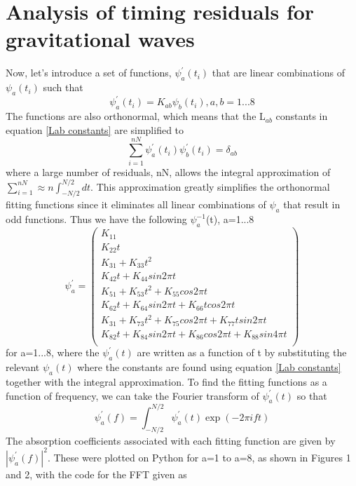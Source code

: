 \documentclass[12pt]{article}
\begin{document}
	\section{Analysis of timing residuals for gravitational waves}
	
	
	Now, let's introduce a set of functions, $\psi_{a}^{'}(t_i)$ that are linear combinations of $\psi_a(t_i)$ such that
	\begin{equation}\label{psi'}
	\psi_{a}^{'}(t_i)=K_{ab}\psi_{b}(t_i), a,b=1...8
	\end{equation}
	The functions are also orthonormal, which means that the L$_{ab}$ constants in equation \ref{Lab constants} are simplified to
	\begin{equation}\label{psi'orthonormal}
	\sum_{i=1}^{nN}\psi_{a}^{'}(t_i)\psi_{b}^{'}(t_i)=\delta_{ab}
	\end{equation}
	where a large number of residuals, nN, allows the integral approximation of $\sum_{i=1}^{nN}\approx n\int_{-N/2}^{N/2}dt$. This approximation greatly simplifies the orthonormal fitting functions since it eliminates all linear combinations of $\psi_a$ that result in odd functions.
	Thus we have the following $\psi_{a}^{-1}$(t), a=1...8
	$$
	\psi_{a}^{'}=
	\begin{pmatrix}
	K_{11}\\
	K_{22}t\\
	K_{31}+K_{33}t^2\\
	K_{42}t+K_{44}sin2 \pi t\\
	K_{51}+K_{53}t^2+K_{55}cos2 \pi t\\
	K_{62}t+K_{64}sin2 \pi t+K_{66}t cos2 \pi t\\
	K_{31}+K_{73}t^2+K_{75}cos2 \pi t+K_{77}t sin2 \pi t\\
	K_{82}t+K_{84}sin2 \pi t+K_{86}cos2 \pi t+K_{88}sin4 \pi t\\
	\end{pmatrix}
	$$
	for a=1...8, where the $\psi_{a}^{'}(t)$ are written as a function of t by substituting the relevant $\psi_a(t)$ where the constants are found using equation \ref{Lab constants} together with the integral approximation. 
	To find the fitting functions as a function of frequency, we can take the Fourier transform of $\psi_a^{'}(t)$ so that
	\begin{equation}\label{psi(f)}
	\psi_a^{'}(f)=\int_{-N/2}^{N/2}\psi_a^{'}(t)\exp({-2\pi i f t})
	\end{equation}
	The absorption coefficients associated with each fitting function are given by $|\psi_a^{'}(f)|^2$. These were plotted on Python for a=1 to a=8, as shown in Figures 1 and 2, with the code for the FFT given as\\
	
\end{document}

